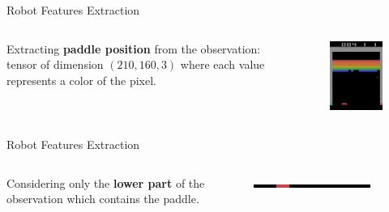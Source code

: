 \begin{frame}{Robot Features Extraction}
    \begin{columns}[c,onlytextwidth]
            \parbox{0.95\textwidth}{
                Extracting \textbf{paddle position} from the
                observation: tensor of dimension $(210, 160, 3)$
                where each value represents a color of the pixel.
            }
            \begin{figure}
                \includegraphics[width=\textwidth]{images/robotfeaturesextractorsequence/robotfeatures-original-image.jpg}
            \end{figure}
    \end{columns}
\end{frame}

\begin{frame}{Robot Features Extraction}
    \begin{columns}[c,onlytextwidth]
            \parbox{0.95\textwidth}{
                Considering only the \textbf{lower part} of the\\
                observation which contains the paddle.}
            \begin{figure}
                \includegraphics[width=\textwidth]{images/robotfeaturesextractorsequence/robotfeatures-bottom-part.jpg}
            \end{figure}
    \end{columns}
\end{frame}


